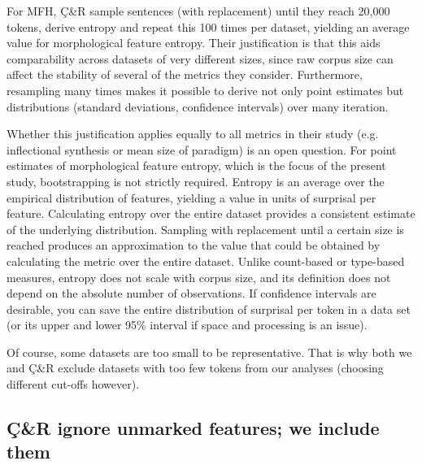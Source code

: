 \documentclass[USenglish]{article}
\providecommand{\DIFaddtex}[1]{{\protect\color{blue}\uwave{#1}}} %
\providecommand{\DIFaddbegin}{} %
\providecommand{\DIFaddend}{} %
\providecommand{\DIFadd}[1]{\texorpdfstring{\DIFaddtex{#1}}{#1}} %
\providecommand{\DIFaddincludegraphics}[2][]{{\color{blue}\fbox{\DIFOincludegraphics[#1]{#2}}}} %
\DeclareRobustCommand{\DIFaddbegin}{\DIFOaddbegin \let\includegraphics\DIFaddincludegraphics} %
\DeclareRobustCommand{\DIFaddend}{\DIFOaddend \let\includegraphics\DIFOincludegraphics} %
\begin{document}
For \DIFaddbegin \DIFadd{the original implementation of }\DIFaddend MFH, Ç\&R sample sentences (with replacement) until they reach 20,000 tokens, derive entropy and repeat this 100 times per dataset, yielding an average value for morphological feature entropy.
Their justification is that this aids comparability across datasets of very different sizes, since raw corpus size can affect the stability of several of the metrics they consider. 
Furthermore, resampling many times makes it possible to derive not only point estimates but distributions (standard deviations, confidence intervals) over many iteration.

Whether this justification applies equally to all metrics in their study (e.g. inflectional synthesis or mean size of paradigm) is an open question. 
For point estimates of morphological feature entropy, which is the focus of the present study, bootstrapping is not strictly required. 
Entropy is an average over the empirical distribution of features, yielding a value in units of surprisal per feature. 
Calculating entropy over the entire dataset provides a consistent estimate of the underlying distribution.
Sampling with replacement until a certain size is reached produces an approximation to the value that could be obtained by calculating the metric over the entire dataset.
Unlike count-based or type-based measures, entropy does not scale with corpus size, and its definition does not depend on the absolute number of observations.
If confidence intervals are desirable, you can save the entire distribution of surprisal per token in a data set (or its upper and lower 95\% interval if space and processing is an issue).

Of course, some datasets are too small to be representative.
That is why both we and Ç\&R exclude datasets with too few tokens from our analyses (choosing different cut-offs however).

\subsection{Ç\&R ignore unmarked features; we include them} \label{appedix:differences_dummy}
\end{document}
